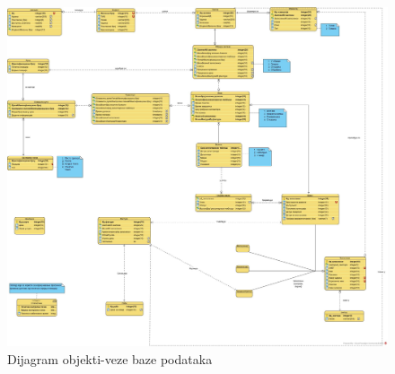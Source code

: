 \begin{figure}[H]
    \centering
    \includegraphics[width=12cm]{Slike/ER.jpg}
    \caption{Dijagram objekti-veze baze podataka}
    \label{fig:er}
\end{figure}
\newpage
